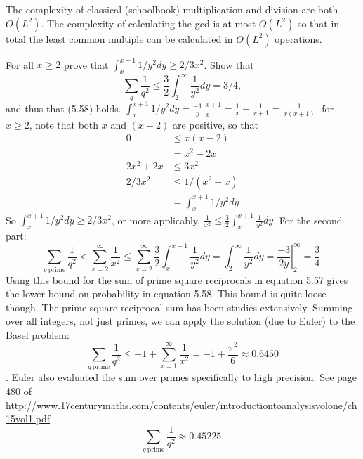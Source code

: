 The complexity of classical (schoolbook) multiplication and division are both $O(L^2)$.  The complexity of calculating the gcd is at most $O(L^2)$ so that in total the least common multiple can be calculated in $O(L^2)$ operations.

 For all $x\geq 2$ prove that $\int_{x}^{x+1}1/y^2dy \geq 2/3x^2$.  Show that $$\sum_q \frac{1}{q^2} \leq \frac{3}{2}\int_{2}^{\infty}\frac{1}{y^2}dy = 3/4,$$ and thus that (5.58) holds.
\Soln $\int_{x}^{x+1}1/y^2dy = \frac{-1}{y}\Big|_{x}^{x+1} = \frac{1}{x}-\frac{1}{x+1} = \frac{1}{x(x+1)}$.  for $x\geq 2$, note that both $x$ and $(x-2)$ are positive, so that
\begin{align*}
0 &\leq x(x-2) \tag{by assumption} \\
 &= x^2-2x \\
2x^2+2x &\leq 3x^2 \tag{add $2x^2+2x$ to both sides} \\
2/3x^2 &\leq 1/(x^2+x) \tag{multiply by $1/(3x^2)(x^2+x)$, note: its positive} \\
 &= \int_{x}^{x+1}1/y^2dy
 \end{align*}
 So $\int_x^{x+1}1/y^2dy \geq 2/3x^2$, or more applicably, $\frac{1}{x^2} \leq \frac{3}{2}\int_x^{x+1}\frac{1}{y^2}dy$.  For the second part:
 $$\sum_{q\ \mathrm{prime}}\frac{1}{q^2} < \sum_{x=2}^{\infty} \frac{1}{x^2} \leq \sum_{x=2}^\infty\frac{3}{2}\int_x^{x+1}\frac{1}{y^2}dy = \int_2^\infty\frac{1}{y^2}dy = \left.\frac{-3}{2y}\right\rvert^\infty_2 = \frac{3}{4}.$$  Using this bound for the sum of prime square reciprocals in equation 5.57 gives the lower bound on probability in equation 5.58.  This bound is quite loose though.  The prime square reciprocal sum has been studies extensively.  Summing over all integers, not just primes, we can apply the solution (due to Euler) to the Basel problem:
 $$\sum_{q\ \mathrm{prime}} \frac{1}{q^2} \leq -1 + \sum_{x=1}^\infty \frac{1}{x^2} = -1 +\frac{\pi^2}{6} \approx 0.6450$$.  Euler also evaluated the sum over primes specifically to high precision.  See page 480 of \url{http://www.17centurymaths.com/contents/euler/introductiontoanalysisvolone/ch15vol1.pdf}
 $$\sum_{q\ \mathrm{prime}}\frac{1}{q^2} \approx 0.45225.$$
 
